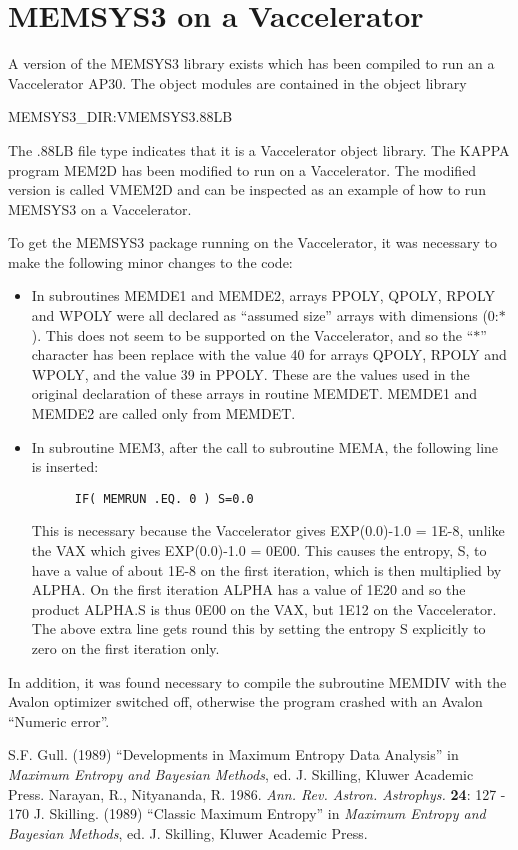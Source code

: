 \section {MEMSYS3 on a Vaccelerator}
A version of the MEMSYS3 library exists which has been compiled to run an a
Vaccelerator AP30. The object modules are contained in the object library

MEMSYS3\_DIR:VMEMSYS3.88LB

The .88LB file type indicates that it is a Vaccelerator object library. The
KAPPA program MEM2D has been modified to run on a Vaccelerator. The modified
version is called VMEM2D and can be inspected as an example of how to run
MEMSYS3 on a Vaccelerator.

To get the MEMSYS3 package running on the Vaccelerator, it was necessary to
make  the following minor changes to the code:

\begin {itemize}
\item In subroutines MEMDE1 and MEMDE2, arrays PPOLY, QPOLY, RPOLY and WPOLY
were all declared as ``assumed size'' arrays with dimensions (0:$*$). This does
not seem to be supported on the Vaccelerator, and so the ``$*$'' character has
been replace with the value 40 for arrays QPOLY, RPOLY and WPOLY, and the value
39 in PPOLY. These are the values used in the original declaration of these
arrays in routine MEMDET. MEMDE1 and MEMDE2 are called only from MEMDET.
\item In subroutine MEM3, after the call to subroutine MEMA, the following line
is inserted:

\begin{verbatim}
      IF( MEMRUN .EQ. 0 ) S=0.0
\end{verbatim}

This is necessary because the Vaccelerator gives EXP(0.0)-1.0 = 1E-8, unlike the
VAX which gives EXP(0.0)-1.0 = 0E00. This causes the entropy, S, to have a value
of about 1E-8 on the first iteration, which is then multiplied by ALPHA. On the
first iteration ALPHA has a value of 1E20 and so the product  ALPHA.S is thus
0E00 on the VAX, but 1E12 on the Vaccelerator. The above extra line gets round
this by setting the entropy S explicitly to zero on the first iteration only.

\end {itemize}

In addition, it was found necessary to compile the subroutine MEMDIV with the
Avalon optimizer switched off, otherwise the program crashed with an Avalon
``Numeric error''.

\begin{thebibliography}{1}
 S.F. Gull. (1989) ``Developments in Maximum Entropy Data
Analysis'' in {\em Maximum Entropy and Bayesian Methods}, ed. J.
Skilling, Kluwer Academic Press.
 Narayan, R., Nityananda, R. 1986. {\em Ann. Rev.
Astron. Astrophys.} {\bf 24}: 127 - 170
 J. Skilling. (1989) ``Classic Maximum Entropy'' in
{\em Maximum Entropy and Bayesian Methods}, ed. J. Skilling, Kluwer
Academic Press.
\end{thebibliography}

